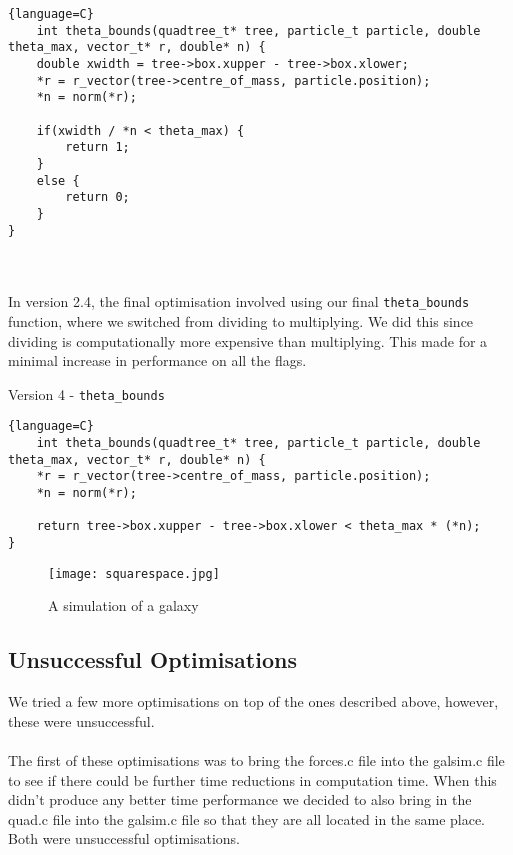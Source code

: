 \documentclass{article}
\begin{document}
\begin{lstlisting}{language=C}
    int theta_bounds(quadtree_t* tree, particle_t particle, double theta_max, vector_t* r, double* n) {
    double xwidth = tree->box.xupper - tree->box.xlower;
    *r = r_vector(tree->centre_of_mass, particle.position);
    *n = norm(*r);

    if(xwidth / *n < theta_max) {
        return 1;
    }
    else {
        return 0;
    }
}
\end{lstlisting}
\\\\
In version 2.4, the final optimisation involved using our final \verb|theta_bounds| function, where we switched from dividing to multiplying. We did this since dividing is computationally more expensive than multiplying. This made for a minimal increase in performance on all the flags.
\begin{center}
    Version 4 - \verb|theta_bounds|
\end{center}
\begin{lstlisting}{language=C}
    int theta_bounds(quadtree_t* tree, particle_t particle, double theta_max, vector_t* r, double* n) {
    *r = r_vector(tree->centre_of_mass, particle.position);
    *n = norm(*r);

    return tree->box.xupper - tree->box.xlower < theta_max * (*n);
}
\end{lstlisting}
\begin{figure}[htb]
\begin{center}
\texttt{[image: squarespace.jpg]}
\caption{A simulation of a galaxy}
\end{center}
\end{figure}
\newpage
\subsection{Unsuccessful Optimisations}
We tried a few more optimisations on top of the ones described above, however, these were unsuccessful.
\\\\
The first of these optimisations was to bring the forces.c file into the galsim.c file to see if there could be further time reductions in computation time. When this didn't produce any better time performance we decided to also bring in the quad.c file into the galsim.c file so that they are all located in the same place. Both were unsuccessful optimisations.
\end{document}

